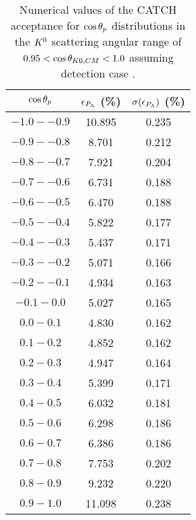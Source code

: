 \begin{table}[!h] 
  \begin{center}
  \caption{Numerical values of the CATCH acceptance for $\cos{\theta_p}$ distributions in the $K^{0}$ scattering angular range of \textbf{$0.95<\cos{\theta_{K0,CM}}<1.0$} assuming detection case .}
  \centering
  \begin{threeparttable}
    \begin{tabular}{ccc}
    $\cos{\theta_p}$ & $\epsilon_{P_{\Lambda}}$ (\%) & $\sigma(\epsilon_{P_{\Lambda}})$ (\%) \\
    \midrule\midrule
    $-1.0 - -0.9$ & 10.895 & 0.235 \\
    \midrule
    $-0.9 - -0.8$ & 8.701 & 0.212 \\
    \midrule
    $-0.8 - -0.7$ & 7.921 & 0.204 \\
    \midrule
    $-0.7 - -0.6$ & 6.731 & 0.188 \\
    \midrule
    $-0.6 - -0.5$ & 6.470 & 0.188 \\
    \midrule
    $-0.5 - -0.4$ & 5.822 & 0.177 \\
    \midrule
    $-0.4 - -0.3$ & 5.437 & 0.171 \\
    \midrule
    $-0.3 - -0.2$ & 5.071 & 0.166 \\
    \midrule
    $-0.2 - -0.1$ & 4.934 & 0.163 \\
    \midrule
    $-0.1 - 0.0$ & 5.027 & 0.165 \\
    \midrule
    $0.0 - 0.1$ & 4.830 & 0.162 \\
    \midrule
    $0.1 - 0.2$ & 4.852 & 0.162 \\
    \midrule
    $0.2 - 0.3$ & 4.947 & 0.164 \\
    \midrule
    $0.3 - 0.4$ & 5.399 & 0.171 \\
    \midrule
    $0.4 - 0.5$ & 6.032 & 0.181 \\
    \midrule
    $0.5 - 0.6$ & 6.298  & 0.186 \\
    \midrule
    $0.6 - 0.7$ & 6.386 & 0.186 \\
    \midrule
    $0.7 - 0.8$ & 7.753 & 0.202 \\
    \midrule
    $0.8 - 0.9$ & 9.232 & 0.220 \\
    \midrule
    $0.9 - 1.0$ & 11.098 & 0.238 \\
    \end{tabular}
  \end{threeparttable}
  \label{tab-Pl-acc_39}
  \end{center}
\end{table}

%
